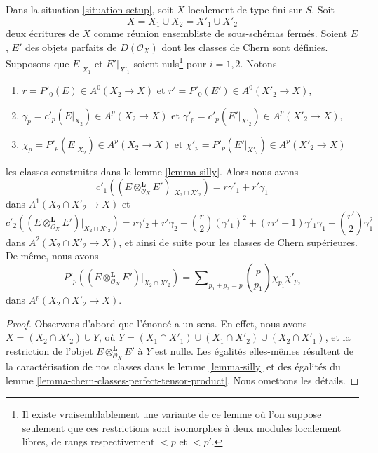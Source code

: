 \begin{lemma}
\label{lemma-silly-tensor-product}
Dans la situation \ref{situation-setup}, soit $X$ localement de type fini sur $S$.
Soit
$$
X = X_1 \cup X_2 = X'_1 \cup X'_2
$$
deux écritures de $X$ comme réunion ensembliste de sous-schémas fermés.
Soient $E$, $E'$ des objets parfaits de $D(\mathcal{O}_X)$
dont les classes de Chern sont définies.
Supposons que $E|_{X_1}$ et $E'|_{X'_1}$ soient nuls\footnote{Il existe vraisemblablement
une variante de ce lemme où l'on suppose seulement que ces restrictions sont
isomorphes à deux modules localement libres,
de rangs respectivement $< p$ et $< p'$.} pour $i = 1, 2$. Notons
\begin{enumerate}
\item $r = P'_0(E) \in A^0(X_2 \to X)$ et
$r' = P'_0(E') \in A^0(X'_2 \to X)$,
\item $\gamma_p = c'_p(E|_{X_2}) \in A^p(X_2 \to X)$ et
$\gamma'_p = c'_p(E'|_{X'_2}) \in A^p(X'_2 \to X)$,
\item $\chi_p = P'_p(E|_{X_2}) \in A^p(X_2 \to X)$ et
$\chi'_p = P'_p(E'|_{X'_2}) \in A^p(X'_2 \to X)$
\end{enumerate}
les classes construites dans le lemme \ref{lemma-silly}. Alors nous avons
$$
c'_1((E \otimes_{\mathcal{O}_X}^\mathbf{L} E')|_{X_2 \cap X'_2}) =
r \gamma'_1 + r' \gamma_1
$$
dans $A^1(X_2 \cap X'_2 \to X)$ et
$$
c'_2((E \otimes_{\mathcal{O}_X}^\mathbf{L} E')|_{X_2 \cap X'_2}) =
r \gamma'_2 + r' \gamma_2 + {r \choose 2} (\gamma'_1)^2 +
(rr' - 1) \gamma'_1\gamma_1 + {r' \choose 2} \gamma_1^2
$$
dans $A^2(X_2 \cap X'_2 \to X)$, et ainsi de suite pour les classes de Chern supérieures.
De même, nous avons
$$
P'_p((E \otimes_{\mathcal{O}_X}^\mathbf{L} E')|_{X_2 \cap X'_2}) =
\sum\nolimits_{p_1 + p_2 = p}
{p \choose p_1} \chi_{p_1} \chi'_{p_2}
$$
dans $A^p(X_2 \cap X'_2 \to X)$.
\end{lemma}

\begin{proof}
Observons d'abord que l'énoncé a un sens. En effet, nous avons
$X = (X_2 \cap X'_2) \cup Y$, où
$Y = (X_1 \cap X'_1) \cup (X_1 \cap X'_2) \cup (X_2 \cap X'_1)$,
et la restriction de l'objet $E \otimes_{\mathcal{O}_X}^\mathbf{L} E'$
à $Y$ est nulle.
Les égalités elles-mêmes résultent de la caractérisation
de nos classes dans le lemme \ref{lemma-silly}
et des égalités du lemme \ref{lemma-chern-classes-perfect-tensor-product}.
Nous omettons les détails.
\end{proof}







